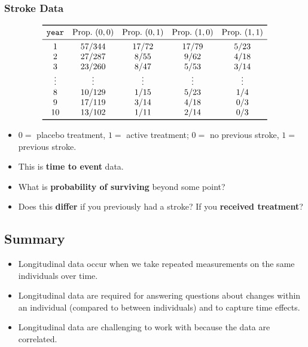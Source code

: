 \subsubsection{Stroke Data}
\[ \begin{array}{ccccc}
        \toprule
        \texttt{year} & \text{Prop.}~(0,0) & \text{Prop.}~(0,1) & \text{Prop.}~(1,0) & \text{Prop.}~(1,1) \\
        \midrule
        1             & 57 / 344           & 17 / 72            & 17 / 79            & 5 / 23             \\
        2             & 27 / 287           & 8 / 55             & 9 / 62             & 4 / 18             \\
        3             & 23 / 260           & 8 / 47             & 5 / 53             & 3 / 14             \\
        \vdots        & \vdots             & \vdots             & \vdots             & \vdots             \\
        8             & 10 / 129           & 1 / 15             & 5 / 23             & 1 / 4              \\
        9             & 17 / 119           & 3 / 14             & 4 / 18             & 0 / 3              \\
        10            & 13 / 102           & 1 / 11             & 2 / 14             & 0 / 3              \\
        \bottomrule
    \end{array} \]
\begin{itemize}
    \item $0 =$ placebo treatment, $1 =$ active treatment; $0 =$ no previous stroke, $1 =$ previous stroke.
    \item This is \textbf{time to event} data.
    \item What is \textbf{probability of surviving} beyond some point?
    \item Does this \textbf{differ} if you previously had a stroke? If you \textbf{received treatment}?
\end{itemize}
\subsection{Summary}
\begin{itemize}
    \item Longitudinal data occur when we take repeated measurements on the same
          individuals over time.
    \item Longitudinal data are required for answering questions about changes within an
          individual (compared to between individuals) and to capture time effects.
    \item Longitudinal data are challenging to work with because the data are correlated.
\end{itemize}